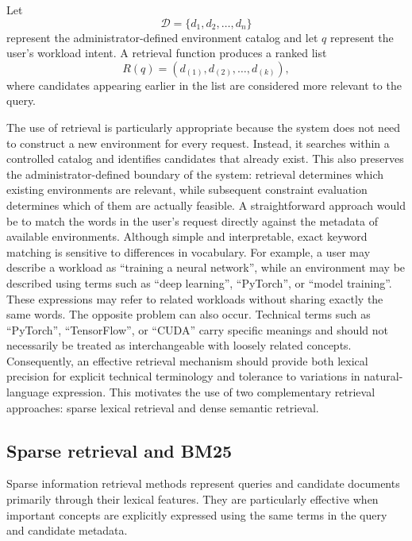 Let
\[
    \mathcal{D} = \{d_1, d_2, \ldots, d_n\}
\]
represent the administrator-defined environment catalog and let \(q\) represent the user's workload intent. A retrieval function produces a ranked list
\[
    R(q) = (d_{(1)}, d_{(2)}, \ldots, d_{(k)}),
\]
where candidates appearing earlier in the list are considered more relevant to the query.

The use of retrieval is particularly appropriate because the system does not need to construct a new environment for every request. Instead, it searches within a controlled catalog and identifies candidates that already exist. This also preserves the administrator-defined boundary of the system: retrieval determines which existing environments are relevant, while subsequent constraint evaluation determines which of them are actually feasible. A straightforward approach would be to match the words in the user's request directly against the metadata of available environments. Although simple and interpretable, exact keyword matching is sensitive to differences in vocabulary. For example, a user may describe a workload as ``training a neural network'', while an environment may be described using terms such as ``deep learning'', ``PyTorch'', or ``model training''. These expressions may refer to related workloads without sharing exactly the same words. The opposite problem can also occur. Technical terms such as ``PyTorch'', ``TensorFlow'', or ``CUDA'' carry specific meanings and should not necessarily be treated as interchangeable with loosely related concepts. Consequently, an effective retrieval mechanism should provide both lexical precision for explicit technical terminology and tolerance to variations in natural-language expression. This motivates the use of two complementary retrieval approaches: sparse lexical retrieval and dense semantic retrieval.

\subsection{Sparse retrieval and BM25}\label{subsec:bm25_theory}

Sparse information retrieval methods represent queries and candidate documents primarily through their lexical features. They are particularly effective when important concepts are explicitly expressed using the same terms in the query and candidate metadata.


